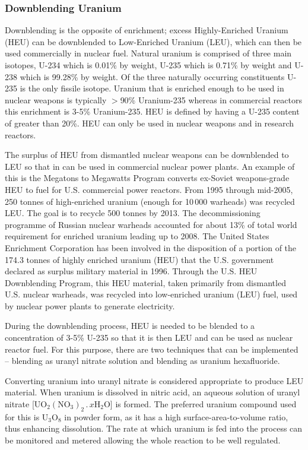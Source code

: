 \documentclass[twoside,titlepage,11pt,twocolumn,a4paper]{article}
\begin{document}
\subsubsection{Downblending Uranium}
Downblending is the opposite of enrichment; excess Highly-Enriched
Uranium (HEU) can be downblended to Low-Enriched Uranium (LEU), which
can then be used commercially in nuclear fuel. Natural uranium is
comprised of three main isotopes, U-234 which is 0.01\% by weight,
U-235 which is 0.71\% by weight and U-238 which is 99.28\% by weight.
Of the three naturally occurring constituents U-235 is the only
fissile isotope.  Uranium that is enriched enough to be used in
nuclear weapons is typically \(>\)90\% Uranium-235 whereas in
commercial reactors this enrichment is 3-5\% Uranium-235.  HEU is
defined by having a U-235 content of greater than 20\%. HEU can only
be used in nuclear weapons and in research reactors.

The surplus of HEU from dismantled nuclear weapons can be downblended
to LEU so that in can be used in commercial nuclear power plants. An
example of this is the Megatons to Megawatts Program converts
ex-Soviet weapons-grade HEU to fuel for U.S. commercial power
reactors. From 1995 through mid-2005, 250 tonnes of high-enriched
uranium (enough for 10\,000 warheads) was recycled LEU. The goal is to
recycle 500 tonnes by 2013. The decommissioning programme of Russian
nuclear warheads accounted for about 13\% of total world requirement
for enriched uranium leading up to 2008. \citep{uraniumEnrichment} The United States
Enrichment Corporation has been involved in the disposition of a
portion of the 174.3 tonnes of highly enriched uranium (HEU) that the
U.S. government declared as surplus military material in 1996. Through
the U.S. HEU Downblending Program, this HEU material, taken primarily
from dismantled U.S. nuclear warheads, was recycled into low-enriched
uranium (LEU) fuel, used by nuclear power plants to generate
electricity.

During the downblending process, HEU is needed to be blended to a
concentration of 3-5\% U-235 so that it is then LEU and can be used as
nuclear reactor fuel. For this purpose, there are two techniques that
can be implemented -- blending as uranyl nitrate solution and blending
as uranium hexafluoride.

Converting uranium into uranyl nitrate is considered appropriate to
produce LEU material.  When uranium is dissolved in nitric acid, an
aqueous solution of uranyl nitrate
[\(\mathrm{UO_2(NO_3)_2\,.\,}x\mathrm{H_2O}\)] is formed. The
preferred uranium compound used for this is \(\mathrm{U_3O_8}\) in
powder form, as it has a high surface-area-to-volume ratio, thus
enhancing dissolution. The rate at which uranium is fed into the
process can be monitored and metered allowing the whole reaction to be
well regulated.
\end{document}
